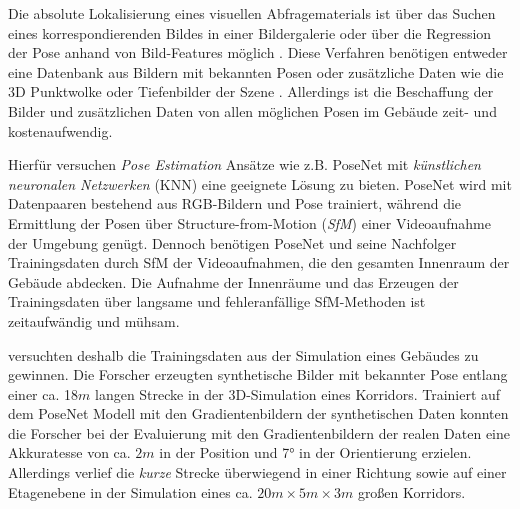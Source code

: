 Die absolute Lokalisierung eines visuellen Abfragematerials ist über das Suchen eines korrespondierenden Bildes in einer Bildergalerie oder über die Regression der Pose anhand von Bild-Features möglich \cite{piascoSurveyVisualBasedLocalization2018}. Diese Verfahren benötigen entweder eine Datenbank aus Bildern mit bekannten Posen \cite{zhangImageBasedLocalization2006, arandjelovicThreeThingsEveryone2012} oder zusätzliche Daten wie die 3D Punktwolke \cite{irscharaStructurefrommotionPointClouds2009, liWorldwidePoseEstimation2012} oder Tiefenbilder der Szene \cite{shottonSceneCoordinateRegression2013}. Allerdings ist die Beschaffung der Bilder und zusätzlichen Daten von allen möglichen Posen im Gebäude zeit- und kostenaufwendig.


Hierfür versuchen \textit{Pose Estimation} Ansätze wie z.B. PoseNet \cite{kendallPoseNetConvolutionalNetwork2015} mit \textit{künstlichen neuronalen Netzwerken} (KNN) eine geeignete Lösung zu bieten. PoseNet wird mit Datenpaaren bestehend aus RGB-Bildern und Pose trainiert, während die Ermittlung der Posen über Structure-from-Motion (\textit{SfM}) einer Videoaufnahme der Umgebung genügt. Dennoch benötigen PoseNet und seine Nachfolger \cite{kendallModellingUncertaintyDeep2016, walchImageBasedLocalizationUsing2017, kendallGeometricLossFunctions2017, clarkVidLocDeepSpatioTemporal2017} Trainingsdaten durch SfM der Videoaufnahmen, die den gesamten Innenraum der Gebäude abdecken. Die Aufnahme der Innenräume und das Erzeugen der Trainingsdaten über langsame und fehleranfällige SfM-Methoden ist zeitaufwändig und mühsam.

\citet{acharyaBIMPoseNetIndoorCamera2019} versuchten deshalb die Trainingsdaten aus der Simulation eines Gebäudes zu gewinnen. Die Forscher erzeugten synthetische Bilder mit bekannter Pose entlang einer ca. 18$m$ langen Strecke in der 3D-Simulation eines Korridors. Trainiert auf dem PoseNet Modell mit den Gradientenbildern der synthetischen Daten konnten die Forscher \citet{acharyaBIMPoseNetIndoorCamera2019} bei der Evaluierung mit den Gradientenbildern der realen Daten eine Akkuratesse von ca. $2m$ in der Position und 7° in der Orientierung erzielen. Allerdings verlief die \textit{kurze} Strecke überwiegend in einer Richtung sowie auf einer Etagenebene in der Simulation eines ca. $20m \times 5m \times 3m$ großen Korridors.


